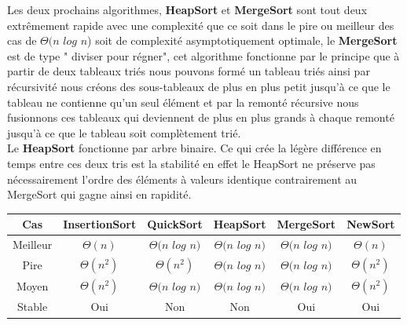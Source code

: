 \documentclass[a4paper, 11pt, oneside]{article}
\begin{document}
Les deux prochains algorithmes, \textbf{HeapSort} et \textbf{MergeSort} sont tout deux extrêmement rapide avec une complexité que ce soit dans le pire ou meilleur des cas de $\Theta(n$ $log$ $n$) soit de complexité asymptotiquement optimale, le \textbf{MergeSort} est de type " diviser pour régner", cet algorithme fonctionne par le principe que à partir de deux tableaux triés nous pouvons formé un tableau triés ainsi par récursivité nous créons des sous-tableaux de plus en plus petit jusqu'à ce que le tableau ne contienne qu'un seul élément et par la remonté récursive nous fusionnons ces tableaux qui deviennent de plus en plus grands à chaque remonté jusqu'à ce que le tableau soit complètement trié.\\ Le \textbf{HeapSort} fonctionne par arbre binaire.
Ce qui crée la légère différence en temps entre ces deux tris est la stabilité en effet le HeapSort ne préserve pas nécessairement l’ordre des éléments à valeurs identique contrairement au MergeSort qui gagne ainsi en rapidité.

\begin{table}[htb]
\begin{tabular}{cccccc}
\hline

Cas   & InsertionSort & QuickSort & HeapSort & MergeSort & NewSort \\ \hline
Meilleur & $\Theta(n)$      & $\Theta(n$ $log$ $n)$   & $\Theta(n$ $log$ $n)$        & $\Theta(n$ $log$ $n)$          & $\Theta(n)$        \\
Pire & $\Theta(n^{2})$     & $\Theta(n^{2})$  & $\Theta(n$ $log$ $n)$         & $\Theta(n$ $log$ $n)$ & $\Theta(n^{2})$       \\
Moyen & $\Theta(n^{2})$      & $\Theta(n$ $log$ $n)$  & $\Theta(n$ $log$ $n)$         & $\Theta(n$ $log$ $n)$         & $\Theta(n^{2})$        \\
Stable & Oui      & Non  & Non         & Oui          & Oui        \\
  
\end{tabular}
\end{table}
\end{document}
